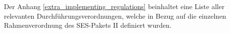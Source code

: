 

 


\bigskip\noindent
Der Anhang \ref{extra_implementing_regulations} beinhaltet eine Liste aller relevanten Durchführungsverordnungen, welche in Bezug auf die einzelnen Rahmenverordnung des \ac{SES}-Pakets II definiert wurden.

